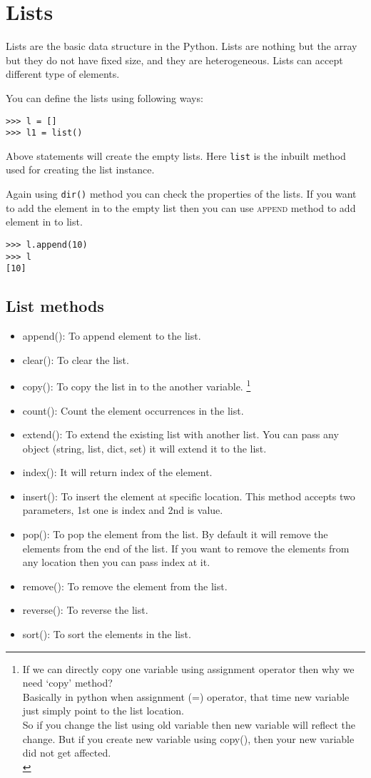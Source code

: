 \documentclass[letterpaper,12pt]{book}
\begin{document}
\section{Lists}
Lists are the basic data structure in the Python. Lists are nothing but the array but they do not have fixed size, and they are heterogeneous. Lists can accept different type of elements.

You can define the lists using following ways:
\begin{lstlisting}
>>> l = []
>>> l1 = list()
\end{lstlisting}
Above statements will create the empty lists. Here \texttt{list} is the inbuilt method used for creating the list instance.

Again using \texttt{dir()} method you can check the properties of the lists.
If you want to add the element in to the empty list then you can use \textsc{append} method to add element in to list.
\begin{lstlisting}
>>> l.append(10)
>>> l
[10]
\end{lstlisting}
\subsection{List methods}
\begin{itemize}
	\item append(): To append element to the list.
	\item clear(): To clear the list.
	\item copy(): To copy the list in to the another variable. \footnote{ If we can directly copy one variable using assignment operator then why we need `copy' method?\\ Basically in python when assignment (=) operator, that time new variable just simply point to the list location.
		      \\
		      So if you change the list using old variable then new variable will reflect the change. But if you create new variable using copy(), then your new variable did not get affected.\\

	      }

	\item count(): Count the element occurrences in the list.
	\item extend(): To extend the existing list with another list. You can pass any object (string, list, dict, set) it will extend it to the list.
	\item index(): It will return index of the element.
	\item insert(): To insert the element at specific location. This method accepts two parameters, 1st one is index and 2nd is value.
	\item pop(): To pop the element from the list. By default it will remove the elements from the end of the list. If you want to remove the elements from any location then you can pass index at it.
	\item remove(): To remove the element from the list.
	\item reverse(): To reverse the list.
	\item sort(): To sort the elements in the list.
\end{itemize}
\clearpage
\end{document}
